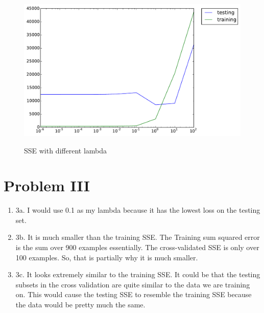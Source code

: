 \documentclass{article}
\begin{document}
    \begin{figure}[h]
      \begin{center}
      \includegraphics[scale=0.7]{SSE.pdf}\\
      \end{center}
      \caption{SSE with different lambda}
      \label{lambda}
    \end{figure}
    
    
\section*{Problem III}
\begin{enumerate}
\item 3a. I would use 0.1 as my lambda because it has the lowest loss on the testing set.

\item 3b. It is much smaller than the training SSE. The Training sum squared error is the sum over 900 examples essentially. The cross-validated SSE is only over 100 examples. So, that is partially why it is much smaller.

\item 3c. It looks extremely similar to the training SSE. It could be that the testing subsets in the cross validation are quite similar to the data we are training on. This would cause the testing SSE to resemble the training SSE because the data would be pretty much the same.
\end{enumerate}
\end{document}

